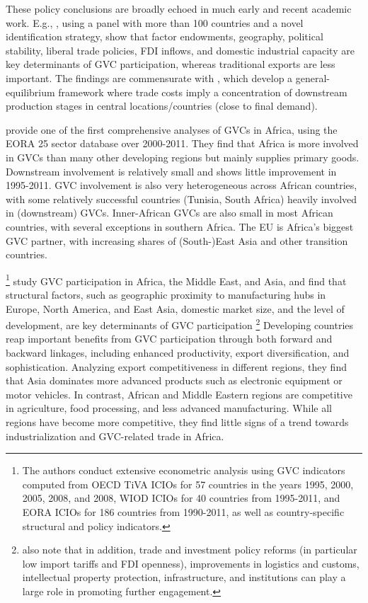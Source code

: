 \documentclass[a4paper]{article}
\begin{document}
These policy conclusions are broadly echoed in much early and recent academic work. E.g., \citet{fernandes2022determinants}, using a panel with more than 100 countries and a novel identification strategy, show that factor endowments, geography, political stability, liberal trade policies, FDI inflows, and domestic industrial capacity are key determinants of GVC participation, whereas traditional exports are less important. The findings are commensurate with \citet{antras2020geography}, which develop a general-equilibrium framework where trade costs imply a concentration of downstream production stages in central locations/countries (close to final demand). \newline
  
 \citet{foster2015global} provide one of the first comprehensive analyses of GVCs in Africa, using the EORA 25 sector database over 2000-2011. They find that Africa is more involved in GVCs than many other developing regions but mainly supplies primary goods. Downstream involvement is relatively small and shows little improvement in 1995-2011. GVC involvement is also very heterogeneous across African countries, with some relatively successful countries (Tunisia, South Africa) heavily involved in (downstream) GVCs. Inner-African GVCs are also small in most African countries, with several exceptions in southern Africa. The EU is Africa's biggest GVC partner, with increasing shares of (South-)East Asia and other transition countries. \newline

\citet{kowalski2015participation}\footnote{The authors conduct extensive econometric analysis using GVC indicators computed from OECD TiVA ICIOs for 57 countries in the years 1995, 2000, 2005, 2008, and 2008, WIOD ICIOs for 40 countries from 1995-2011, and EORA ICIOs for 186 countries from 1990-2011, as well as country-specific structural and policy indicators.} study GVC participation in Africa, the Middle East, and Asia, and find that structural factors, such as geographic proximity to manufacturing hubs in Europe, North America, and East Asia, domestic market size, and the level of development, are key determinants of GVC participation \footnote{\citet{kowalski2015participation} also note that in addition, trade and investment policy reforms (in particular low import tariffs and FDI openness), improvements in logistics and customs, intellectual property protection, infrastructure, and institutions can play a large role in promoting further engagement.}  Developing countries reap important benefits from GVC participation through both forward and backward linkages, including enhanced productivity, export diversification, and sophistication. Analyzing export competitiveness in different regions, they find that Asia dominates more advanced products such as electronic equipment or motor vehicles. In contrast, African and Middle Eastern regions are competitive in agriculture, food processing, and less advanced manufacturing. While all regions have become more competitive, they find little signs of a trend towards industrialization and GVC-related trade in Africa. \newline  
\end{document}

